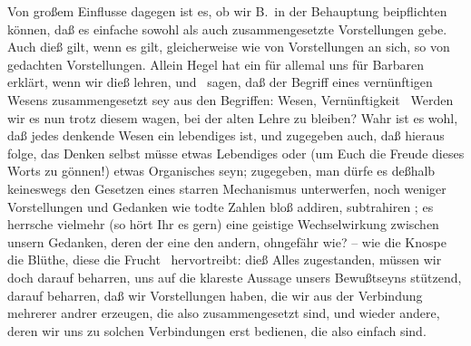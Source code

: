 Von großem Einflusse dagegen ist es, ob wir B.\ in der Behauptung  beipflichten können, daß es einfache sowohl als auch zusammengesetzte Vorstellungen gebe. Auch dieß gilt, wenn es gilt, gleicherweise wie von Vorstellungen an sich, so von gedachten Vorstellungen. Allein Hegel hat ein für allemal uns für Barbaren erklärt, wenn wir dieß lehren, und \zB\ sagen, daß der Begriff eines vernünftigen Wesens zusammengesetzt sey aus den Begriffen: Wesen, Vernünftigkeit \udgl\ Werden wir es nun trotz diesem wagen, bei der alten Lehre zu bleiben? Wahr ist es wohl, daß jedes denkende Wesen ein lebendiges ist, und zugegeben auch, daß hieraus folge, das Denken selbst müsse etwas Lebendiges oder (um Euch die Freude dieses Worts zu gönnen!) etwas Organisches seyn; zugegeben, man dürfe es deßhalb keineswegs den Gesetzen eines starren Mechanismus unterwerfen, noch weniger Vorstellungen und Gedanken wie todte Zahlen bloß addiren, subtrahiren \udgl ; es herrsche vielmehr (so hört Ihr es gern) eine geistige Wechselwirkung zwischen unsern Gedanken, deren der eine den andern, ohngefähr wie? -- wie die Knospe die Blüthe, diese die Frucht \usw\ hervortreibt: dieß Alles zugestanden, müssen wir doch darauf beharren, uns auf die klareste Aussage unsers Bewußtseyns stützend, darauf beharren, daß wir Vorstellungen haben, die wir aus der Verbindung mehrerer andrer erzeugen, die also zusammengesetzt sind, und wieder andere, deren wir uns zu solchen Verbindungen erst bedienen, die also einfach sind. \par
